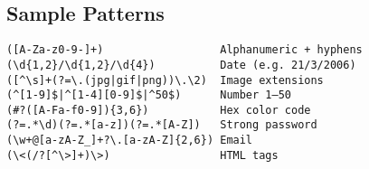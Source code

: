 \documentclass[10pt]{article}
\begin{document}
\begin{multicols}{2}
\section*{Sample Patterns}
\begin{lstlisting}
([A-Za-z0-9-]+)                  Alphanumeric + hyphens
(\d{1,2}/\d{1,2}/\d{4})          Date (e.g. 21/3/2006)
([^\s]+(?=\.(jpg|gif|png))\.\2)  Image extensions
(^[1-9]$|^[1-4][0-9]$|^50$)      Number 1–50
(#?([A-Fa-f0-9]){3,6})           Hex color code
(?=.*\d)(?=.*[a-z])(?=.*[A-Z])   Strong password
(\w+@[a-zA-Z_]+?\.[a-zA-Z]{2,6}) Email
(\<(/?[^\>]+)\>)                 HTML tags
\end{lstlisting}

\end{multicols}
\end{document}
